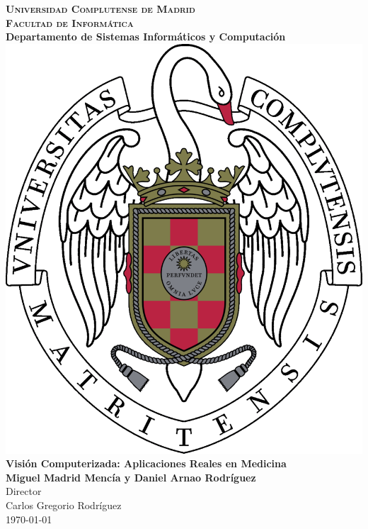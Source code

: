
\begin{titlepage}
\begin{center}

  \textbf{\textsc{\LARGE Universidad Complutense de Madrid}}\\[1cm]
  \textbf{\textsc{\Large Facultad de Informática}}\\
  \textbf{Departamento de Sistemas Informáticos y Computación}\\[2cm]
  \includegraphics[scale=0.17]{imagenes/logos/logo-ucm.pdf}\\[2cm]
  \textbf{\LARGE Visión Computerizada: Aplicaciones Reales en Medicina}\\[1cm]
  \textbf{\large Miguel Madrid Mencía y Daniel Arnao Rodríguez}\\[2cm]
  Director\\
  \large Carlos Gregorio Rodríguez\\
  \vfill
  \today
\end{center}
\end{titlepage}
